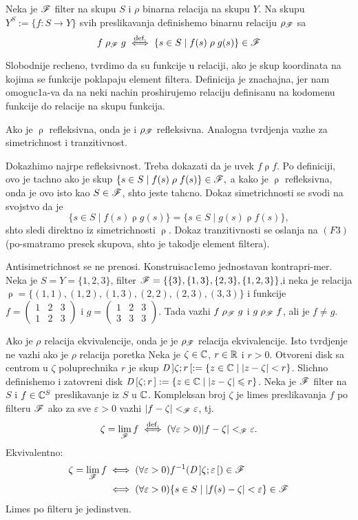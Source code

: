 \documentclass[../maing.tex]{subfiles}
\begin{document}
    {\de Neka je $\mathscr{F}$ filter na skupu $S$ i $\rho$ binarna relacija na skupu $Y$. Na skupu $Y^S:=\{f:S\to Y\}$ svih preslikavanja definishemo binarnu relaciju $\rho_{\mathscr{F}}$ sa $$f\mathrel{\rho_{\mathscr{F}}} g \overset{\text{def.}}{\iff} \{s \in S \mid f(s) \mathrel{\rho} g(s)\}\in \mathscr{F}$$}

    Slobodnije recheno, tvrdimo da su funkcije u relaciji, ako je skup koordinata na kojima se funkcije poklapaju element filtera. Definicija je znachajna, jer nam omoguc1a-va da na neki nachin proshirujemo relaciju definisanu na kodomenu funkcije do relacije na skupu funkcija.

    {\tvr Ako je $\mathrel{\rho}$ refleksivna, onda je i $\mathrel{\rho_{\mathscr{F}}}$ refleksivna. Analogna tvrdjenja vazhe za simetrichnost i tranzitivnost.}

    \dok Dokazhimo najrpe refleksivnost. Treba dokazati da je uvek $f\mathrel{\rho}f$. Po definiciji, ovo je tachno ako je skup $\{s\in S\mid f(s)\mathrel{\rho}f(s)\} \in \mathscr{F},$ a kako je $\mathrel{\rho}$ refleksivna, onda je ovo isto kao $S \in \mathscr{F}$, shto jeste tahcno. Dokaz simetrichnosti se svodi na svojstvo da je $$\{s \in S\mid  f(s) \mathrel{\rho} g(s)\}=\{s \in S\mid  g(s) \mathrel{\rho} f(s)\},$$ shto sledi direktno iz simetrichnosti $\mathrel{\rho}$. Dokaz tranzitivnosti se oslanja na $(F3)$ (po-smatramo presek skupova, shto je takodje element filtera).

    \nap Antisimetrichnost se ne prenosi. Konstruisac1emo jednostavan kontrapri-mer. Neka je $S=Y=\{1,2,3\}$, filter $\mathscr{F}=\{\{3\},\{1,3\},\{2,3\},\{1,2,3\}\}$,i neka je relacija $\mathrel{\rho}=\{(1,1),(1,2),(1,3),(2,2),(2,3),(3,3)\}$ i funkcije $f=\begin{pmatrix}
1 & 2 & 3\\
1 & 2 & 3
\end{pmatrix}$ i $g=\begin{pmatrix}
1 & 2 & 3\\
3 & 3 & 3
\end{pmatrix}$. Tada vazhi $f\mathrel{\rho_{\mathscr{F}}}g$ i $g\mathrel{\rho_{\mathscr{F}}}f$, ali je $f\neq g$.

    {\posl Ako je $\rho$ relacija ekvivalencije, onda je je $\rho_{\mathscr{F}}$ relacija ekvivalencije. Isto tvrdjenje ne vazhi ako je $\rho$ relacija poretka}
    {\de Neka je $\zeta \in \mathbb{C}$, $r \in \mathbb{R}$ i $r>0$. Otvoreni disk sa centrom u $\zeta$ poluprechnika $r$ je skup $\mathit{D}\,]\zeta;r\,[:=\{z\in \mathbb{C}\mid |z-\zeta|<r\}$. Slichno definishemo i zatovreni disk $\mathit{D}\,[\zeta;r\,]:=\{z\in \mathbb{C}\mid |z-\zeta|\leqslant r\}$. }
    {\de Neka je $\mathscr{F}$ filter na $S$ i $f\in \mathbb{C}^S$ preslikavanje iz $S$ u $\mathbb{C}$. Kompleksan broj $\zeta$ je limes preslikavanja $f$ po filteru $\mathscr{F}$ ako za sve $\varepsilon>0$ vazhi $|f-\zeta|<_{\mathscr{F}} \varepsilon$, tj. \[\zeta= \lim_{\mathscr{F}} f \overset{\text{def.}}{\iff} (\forall \varepsilon >0)|f-\zeta|<_{\mathscr{F}}\varepsilon.\]}
    Ekvivalentno: 
    \begin{align*}\zeta=\lim_{\mathscr{F}} f &\iff (\forall \varepsilon>0) f^{-1}(\mathit{D}\,]\zeta;\varepsilon\,[)\in \mathscr{F}\\
    &\iff (\forall \varepsilon>0) \{s\in S\mid|f(s)-\zeta|<\varepsilon\}\in \mathscr{F}
    \end{align*}
    {\tvr Limes po filteru je jedinstven.}
\end{document}
